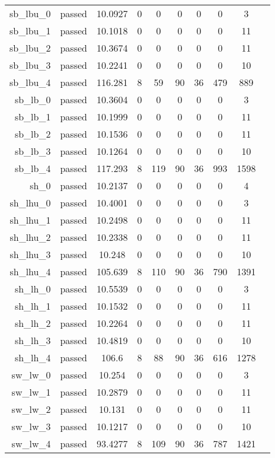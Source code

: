 \begin{longtable}{r|ccccccccc}
    sb\_lbu\_0 & passed & 10.0927 & 0 & 0 & 0 & 0 & 0 & 3 \\
    sb\_lbu\_1 & passed & 10.1018 & 0 & 0 & 0 & 0 & 0 & 11 \\
    sb\_lbu\_2 & passed & 10.3674 & 0 & 0 & 0 & 0 & 0 & 11 \\
    sb\_lbu\_3 & passed & 10.2241 & 0 & 0 & 0 & 0 & 0 & 10 \\
    sb\_lbu\_4 & passed & 116.281 & 8 & 59 & 90 & 36 & 479 & 889 \\
    sb\_lb\_0 & passed & 10.3604 & 0 & 0 & 0 & 0 & 0 & 3 \\
    sb\_lb\_1 & passed & 10.1999 & 0 & 0 & 0 & 0 & 0 & 11 \\
    sb\_lb\_2 & passed & 10.1536 & 0 & 0 & 0 & 0 & 0 & 11 \\
    sb\_lb\_3 & passed & 10.1264 & 0 & 0 & 0 & 0 & 0 & 10 \\
    sb\_lb\_4 & passed & 117.293 & 8 & 119 & 90 & 36 & 993 & 1598 \\
    sh\_0 & passed & 10.2137 & 0 & 0 & 0 & 0 & 0 & 4 \\
    sh\_lhu\_0 & passed & 10.4001 & 0 & 0 & 0 & 0 & 0 & 3 \\
    sh\_lhu\_1 & passed & 10.2498 & 0 & 0 & 0 & 0 & 0 & 11 \\
    sh\_lhu\_2 & passed & 10.2338 & 0 & 0 & 0 & 0 & 0 & 11 \\
    sh\_lhu\_3 & passed & 10.248 & 0 & 0 & 0 & 0 & 0 & 10 \\
    sh\_lhu\_4 & passed & 105.639 & 8 & 110 & 90 & 36 & 790 & 1391 \\
    sh\_lh\_0 & passed & 10.5539 & 0 & 0 & 0 & 0 & 0 & 3 \\
    sh\_lh\_1 & passed & 10.1532 & 0 & 0 & 0 & 0 & 0 & 11 \\
    sh\_lh\_2 & passed & 10.2264 & 0 & 0 & 0 & 0 & 0 & 11 \\
    sh\_lh\_3 & passed & 10.4819 & 0 & 0 & 0 & 0 & 0 & 10 \\
    sh\_lh\_4 & passed & 106.6 & 8 & 88 & 90 & 36 & 616 & 1278 \\
    sw\_lw\_0 & passed & 10.254 & 0 & 0 & 0 & 0 & 0 & 3 \\
    sw\_lw\_1 & passed & 10.2879 & 0 & 0 & 0 & 0 & 0 & 11 \\
    sw\_lw\_2 & passed & 10.131 & 0 & 0 & 0 & 0 & 0 & 11 \\
    sw\_lw\_3 & passed & 10.1217 & 0 & 0 & 0 & 0 & 0 & 10 \\
    sw\_lw\_4 & passed & 93.4277 & 8 & 109 & 90 & 36 & 787 & 1421 \\

\end{longtable}
